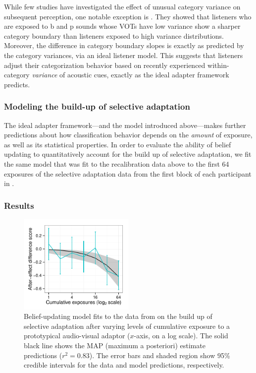 While few studies have investigated the effect of unusual category variance on subsequent perception, one notable exception is \textcite{Clayards2008}.  They showed that listeners who are exposed to \ph b and \ph p sounds whose VOTs have low variance show a sharper category boundary than listeners exposed to high variance distributions.  Moreover, the difference in category boundary slopes is exactly as predicted by the category variances, via an ideal listener model.  This suggests that listeners adjust their categorization behavior based on recently experienced within-category \emph{variance} of acoustic cues, exactly as the ideal adapter framework predicts.

\subsubsection{Modeling the build-up of selective adaptation}
\label{sec:methods-results}

The ideal adapter framework---and the model introduced above---makes further predictions about how classification behavior depends on the \emph{amount} of exposure, as well as its statistical properties.  In order to evaluate the ability of belief updating to quantitatively account for the build up of selective adaptation, we fit the same model that was fit to the recalibration data above to the first 64 exposures of the selective adaptation data from the first block of each participant in \textcite{Vroomen2007}.

\subsubsection{Results}
\label{sec:results-discussion}

\begin{figure}[htb]
  \centering
  \includegraphics[width=0.5\textwidth]{figure/vroomen-selad-ae-fits-first-64.pdf}
  \caption{Belief-updating model fits to the data from \protect\textcite{Vroomen2007} on the build up of selective adaptation after varying levels of cumulative exposure to a prototypical audio-visual adaptor ($x$-axis, on a log scale).  The solid black line shows the MAP (maximum a posteriori) estimate predictions ($r^2=0.83$). The error bars and shaded region show 95\% credible intervals for the data and model predictions, respectively. }
  \label{fig:selad-buildup-preds}
\end{figure}

